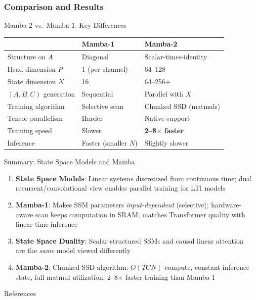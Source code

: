 \subsubsection{Comparison and Results}

\begin{frame}{Mamba-2 vs.\ Mamba-1: Key Differences}

  \begin{center}
  \begin{tabular}{lll}
    \toprule
    & \textbf{Mamba-1} & \textbf{Mamba-2} \\
    \midrule
    Structure on $A$    & Diagonal         & Scalar-times-identity \\
    Head dimension $P$  & 1 (per channel)  & 64--128 \\
    State dimension $N$ & 16               & 64--256+ \\
    $(A,B,C)$ generation & Sequential       & Parallel with $X$ \\
    Training algorithm  & Selective scan   & Chunked SSD (matmuls) \\
    Tensor parallelism  & Harder           & Native support \\
    Training speed      & Slower           & \textbf{2--8$\times$ faster} \\
    Inference           & Faster (smaller $N$) & Slightly slower \\
    \bottomrule
  \end{tabular}
  \end{center}

\end{frame}

\begin{frame}{Summary: State Space Models and Mamba}

  \begin{enumerate}
    \item \textbf{State Space Models}: Linear systems discretized from continuous time; dual recurrent/convolutional view enables parallel training for LTI models
    \item \textbf{Mamba-1}: Makes SSM parameters \emph{input-dependent} (selective); hardware-aware scan keeps computation in SRAM; matches Transformer quality with linear-time inference
    \item \textbf{State Space Duality}: Scalar-structured SSMs and causal linear attention are the \emph{same} model viewed differently
    \item \textbf{Mamba-2}: Chunked SSD algorithm: $O(TCN)$ compute, constant inference state, full matmul utilization; 2--8$\times$ faster training than Mamba-1
  \end{enumerate}

  \vspace{0.5em}
  \begin{block}{References}
    \cite{gu2022s4} \quad \cite{gu2024mamba} \quad \cite{dao2024mamba2}
  \end{block}
\end{frame}

